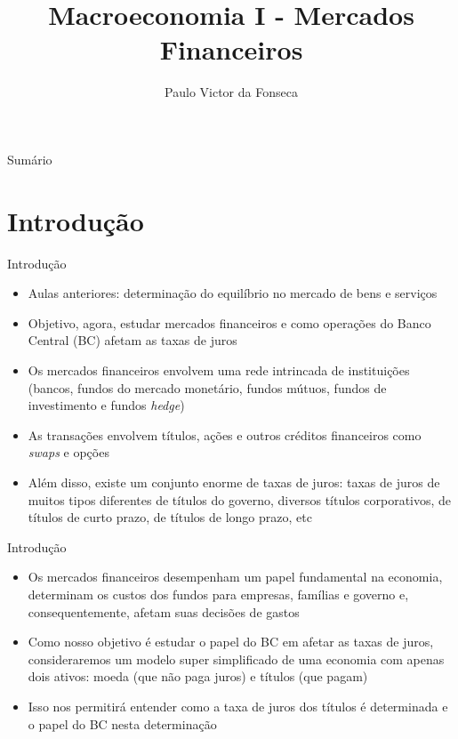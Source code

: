 \documentclass[10pt]{beamer}
\title[]{Macroeconomia I - Mercados Financeiros}
\author[]{Paulo Victor da Fonseca}
\date{}
\begin{document}
\begin{frame}[plain]
\end{frame}

\begin{frame}{Sumário}
    \tableofcontents
\end{frame}

\section{Introdução}
\begin{frame}{Introdução}
    \begin{itemize}
        \item Aulas anteriores: determinação do equilíbrio no mercado de bens e serviços
        \bigskip
        \item Objetivo, agora, estudar mercados financeiros e como operações do Banco Central (BC) afetam as taxas de juros
        \bigskip
        \item Os mercados financeiros envolvem uma rede intrincada de instituições (bancos, fundos do mercado monetário, fundos mútuos, fundos de investimento e fundos \emph{hedge})
        \bigskip
        \item As transações envolvem títulos, ações e outros créditos financeiros como \emph{swaps} e opções
        \bigskip
        \item Além disso, existe um conjunto enorme de taxas de juros: taxas de juros de muitos tipos diferentes de títulos do governo, diversos títulos corporativos, de títulos de curto prazo, de títulos de longo prazo, etc
    \end{itemize}
\end{frame}

\begin{frame}{Introdução}
    \begin{itemize}
        \item Os mercados financeiros desempenham um papel fundamental na economia, determinam os custos dos fundos para empresas, famílias e governo e, consequentemente, afetam suas decisões de gastos
        \bigskip
        \item Como nosso objetivo é estudar o papel do BC em afetar as taxas de juros, consideraremos um modelo super simplificado de uma economia com apenas dois ativos: moeda (que não paga juros) e títulos (que pagam)
        \bigskip
        \item Isso nos permitirá entender como a taxa de juros dos títulos é determinada e o papel do BC nesta determinação
    \end{itemize}
\end{frame}
\end{document}

